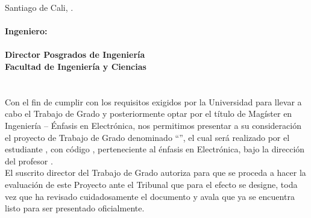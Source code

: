 {%


\thispagestyle{empty}
\noindent Santiago de Cali, \fecha. \\
\vspace{1.5cm}\\
\noindent \textbf{Ingeniero:}\\
\textbf{\directorIE}\\
\noindent \textbf{Director Posgrados de Ingeniería} \\
\textbf{Facultad de Ingenier\'ia y Ciencias} \\
\\

\vspace{1.5cm}\\
 \noindent Con el fin de cumplir con los requisitos exigidos por la Universidad para llevar a cabo el Trabajo de Grado y posteriormente optar por el título de Magíster en Ingeniería -- Énfasis en Electrónica, nos permitimos presentar a su consideración el proyecto de Trabajo de Grado denominado ``\titulovar'', el cual será realizado por el estudiante \authorA, con código \authorACOD, perteneciente al énfasis en Electrónica, bajo la dirección del profesor \director.\\

 \noident El suscrito director del Trabajo de Grado autoriza para que se proceda a hacer la evaluación de este Proyecto ante el Tribunal que para el efecto se designe, toda vez que ha revisado cuidadosamente el documento y avala que ya se encuentra listo para ser presentado oficialmente.\\

}
